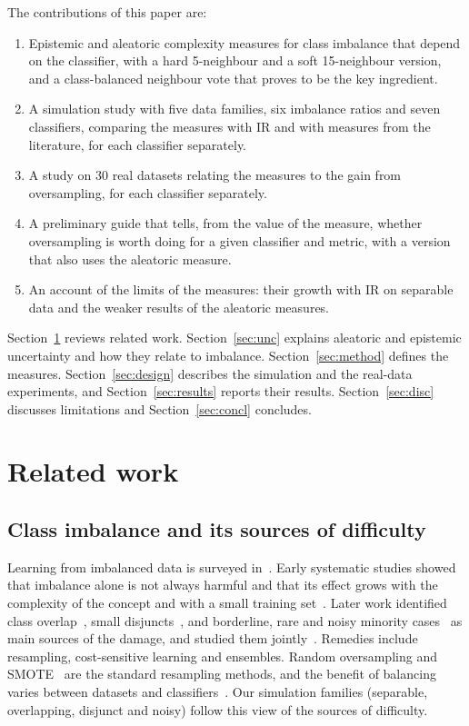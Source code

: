 \documentclass[preprint,12pt]{elsarticle}
\newcommand{\IR}{\mathrm{IR}}
\begin{document}
The contributions of this paper are:
\begin{enumerate}
\item Epistemic and aleatoric complexity measures for class imbalance that depend on the classifier, with a hard 5-neighbour and a soft 15-neighbour version, and a class-balanced neighbour vote that proves to be the key ingredient.
\item A simulation study with five data families, six imbalance ratios and seven classifiers, comparing the measures with $\IR$ and with measures from the literature, for each classifier separately.
\item A study on 30 real datasets relating the measures to the gain from oversampling, for each classifier separately.
\item A preliminary guide that tells, from the value of the measure, whether oversampling is worth doing for a given classifier and metric, with a version that also uses the aleatoric measure.
\item An account of the limits of the measures: their growth with $\IR$ on separable data and the weaker results of the aleatoric measures.
\end{enumerate}

Section~\ref{sec:related} reviews related work. Section~\ref{sec:unc} explains aleatoric and epistemic uncertainty and how they relate to imbalance. Section~\ref{sec:method} defines the measures. Section~\ref{sec:design} describes the simulation and the real-data experiments, and Section~\ref{sec:results} reports their results. Section~\ref{sec:disc} discusses limitations and Section~\ref{sec:concl} concludes.

\section{Related work}\label{sec:related}
\subsection{Class imbalance and its sources of difficulty}
Learning from imbalanced data is surveyed in~\cite{He2009,Fernandez2018}. Early systematic studies showed that imbalance alone is not always harmful and that its effect grows with the complexity of the concept and with a small training set~\cite{Japkowicz2002}. Later work identified class overlap~\cite{Prati2004,Vuttipittayamongkol2021}, small disjuncts~\cite{Jo2004}, and borderline, rare and noisy minority cases~\cite{Napierala2016} as main sources of the damage, and studied them jointly~\cite{Lopez2013,Santos2022}. Remedies include resampling, cost-sensitive learning and ensembles. Random oversampling and SMOTE~\cite{Chawla2002} are the standard resampling methods, and the benefit of balancing varies between datasets and classifiers~\cite{Batista2004}. Our simulation families (separable, overlapping, disjunct and noisy) follow this view of the sources of difficulty.
\end{document}
